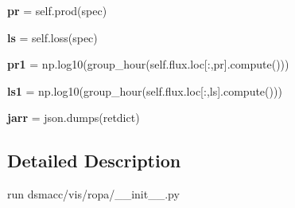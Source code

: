 \begin{DoxyCompactItemize}
\mbox{\label{namespacedsmacc_1_1vis_1_1ropa_a013121dcd5f75a81449059a864cd86ba}} 
{\bfseries pr} = self.\+prod(spec)
\item 
\mbox{\label{namespacedsmacc_1_1vis_1_1ropa_a59dc1a63621500950da8864712871d52}} 
{\bfseries ls} = self.\+loss(spec)
\item 
\mbox{\label{namespacedsmacc_1_1vis_1_1ropa_a87f2b5c32637f937dbe55c499ce96a66}} 
{\bfseries pr1} = np.\+log10(group\+\_\+hour(self.\+flux.\+loc\mbox{[}\+:,pr\mbox{]}.compute()))
\item 
\mbox{\label{namespacedsmacc_1_1vis_1_1ropa_a47d2488c6bd11f09efb4fca5b9b559d1}} 
{\bfseries ls1} = np.\+log10(group\+\_\+hour(self.\+flux.\+loc\mbox{[}\+:,ls\mbox{]}.compute()))
\item 
\mbox{\label{namespacedsmacc_1_1vis_1_1ropa_a3846dc5f0688c95284ae87d9bf0305d7}} 
{\bfseries jarr} = json.\+dumps(retdict)
\end{DoxyCompactItemize}


\subsection{Detailed Description}
\begin{DoxyVerb} run dsmacc/vis/ropa/__init__.py\end{DoxyVerb}
 
